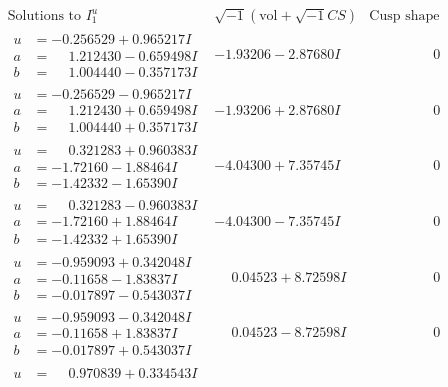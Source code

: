 \documentclass[1p]{elsarticle_modified}
\theoremstyle{definition}
\newcommand{\I}{\sqrt{-1}}
\begin{document}
$$\begin{array}{c|c|c}  
\text{Solutions to }I^u_{1}& \I (\text{vol} + \sqrt{-1}CS) & \text{Cusp shape}\\
 \hline 
\begin{aligned}
u &= -0.256529 + 0.965217 I \\
a &= \phantom{-}1.212430 - 0.659498 I \\
b &= \phantom{-}1.004440 - 0.357173 I\end{aligned}
 & -1.93206 - 2.87680 I & \phantom{-0.000000 } 0 \\ \hline\begin{aligned}
u &= -0.256529 - 0.965217 I \\
a &= \phantom{-}1.212430 + 0.659498 I \\
b &= \phantom{-}1.004440 + 0.357173 I\end{aligned}
 & -1.93206 + 2.87680 I & \phantom{-0.000000 } 0 \\ \hline\begin{aligned}
u &= \phantom{-}0.321283 + 0.960383 I \\
a &= -1.72160 - 1.88464 I \\
b &= -1.42332 - 1.65390 I\end{aligned}
 & -4.04300 + 7.35745 I & \phantom{-0.000000 } 0 \\ \hline\begin{aligned}
u &= \phantom{-}0.321283 - 0.960383 I \\
a &= -1.72160 + 1.88464 I \\
b &= -1.42332 + 1.65390 I\end{aligned}
 & -4.04300 - 7.35745 I & \phantom{-0.000000 } 0 \\ \hline\begin{aligned}
u &= -0.959093 + 0.342048 I \\
a &= -0.11658 - 1.83837 I \\
b &= -0.017897 - 0.543037 I\end{aligned}
 & \phantom{-}0.04523 + 8.72598 I & \phantom{-0.000000 } 0 \\ \hline\begin{aligned}
u &= -0.959093 - 0.342048 I \\
a &= -0.11658 + 1.83837 I \\
b &= -0.017897 + 0.543037 I\end{aligned}
 & \phantom{-}0.04523 - 8.72598 I & \phantom{-0.000000 } 0 \\ \hline\begin{aligned}
u &= \phantom{-}0.970839 + 0.334543 I \\

\end{aligned}
\end{array}$$
\end{document}
